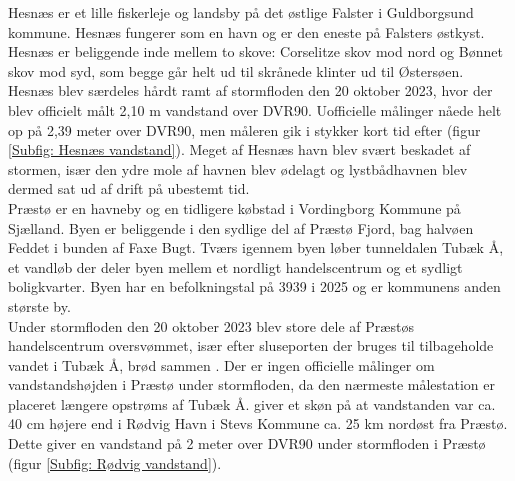 Hesnæs er et lille fiskerleje og landsby på det østlige Falster i Guldborgsund kommune. Hesnæs fungerer som en havn og er den eneste på Falsters østkyst. Hesnæs er beliggende inde mellem to skove: Corselitze skov mod nord og Bønnet skov mod syd, som begge går helt ud til skrånede klinter ud til Østersøen. \\
Hesnæs blev særdeles hårdt ramt af stormfloden den 20 oktober 2023, hvor der blev officielt målt 2,10 m vandstand over DVR90. Uofficielle målinger nåede helt op på 2,39 meter over DVR90, men måleren gik i stykker kort tid efter (figur \ref{Subfig: Hesnæs vandstand}). Meget af Hesnæs havn blev svært beskadet af stormen, især den ydre mole af havnen blev ødelagt og lystbådhavnen blev dermed sat ud af drift på ubestemt tid. \\

Præstø er en havneby og en tidligere købstad i Vordingborg Kommune på Sjælland. Byen er beliggende i den sydlige del af Præstø Fjord, bag halvøen Feddet i bunden af Faxe Bugt. Tværs igennem byen løber tunneldalen Tubæk Å, et vandløb der deler byen mellem et nordligt handelscentrum og et sydligt boligkvarter. Byen har en befolkningstal på 3939 i 2025 \citep{danmarks_statistisk_mobile_nodate} og er kommunens anden største by. \\
Under stormfloden den 20 oktober 2023 blev store dele af Præstøs handelscentrum oversvømmet, især efter sluseporten der bruges til tilbageholde vandet i Tubæk Å, brød sammen \citep{uldall_sluseport_2023}. Der er ingen officielle målinger om vandstandshøjden i Præstø under stormfloden, da den nærmeste målestation er placeret længere opstrøms af Tubæk Å. \cite{cowi_praesto_2025} giver et skøn på at vandstanden var ca. 40 cm højere end i Rødvig Havn i Stevs Kommune ca. 25 km nordøst fra Præstø. Dette giver en vandstand på 2 meter over DVR90 under stormfloden i Præstø (figur \ref{Subfig: Rødvig vandstand}).


